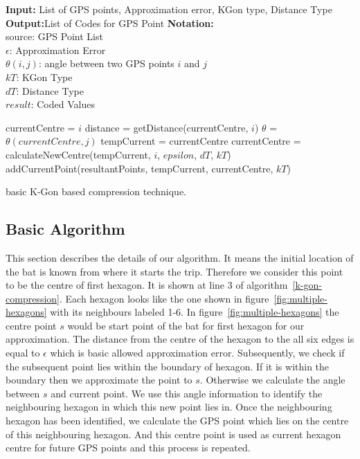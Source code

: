 \documentclass[conference]{IEEEtran}
\begin{document}
\begin{algorithm}[ht]
\textbf{Input:} List of GPS points, Approximation error, KGon type, Distance Type\\
\textbf{Output:}List of Codes for GPS Point
\textbf{Notation:}\\
source: GPS Point List\\
$\epsilon$: Approximation Error\\
$\theta(i,j)$: angle between two GPS points $i$ and $j$\\
$kT$: KGon Type\\
$dT$: Distance Type\\
$result$: Coded Values
\begin{algorithmic}[1]
   \State currentCentre = $i$
\Else
   \State distance = getDistance(currentCentre, $i$)
   \State $\theta$ = $\theta(currentCentre,j)$
        \State tempCurrent = currentCentre
        \State currentCentre = calculateNewCentre(tempCurrent, $i$, $epsilon$, $dT$, $kT$)
        \State addCurrentPoint(resultantPoints, tempCurrent, currentCentre, $kT$)
    \EndIf
\EndIf
\EndFor
\end{algorithmic}
\caption{basic K-Gon based compression technique.}
\label{k-gon-compression}
\end{algorithm}

\subsection{Basic Algorithm}
\label{subs:algorithm}

This section describes the details of our algorithm. It means the initial location of the bat is known from where it 
starts the trip. Therefore we consider this point to be the centre of first hexagon. It is shown at line 3 
of algorithm~\ref{k-gon-compression}. Each hexagon looks like the one shown in figure~\ref{fig:multiple-hexagons}
with its neighbours labeled 1-6. In figure~\ref{fig:multiple-hexagons} the centre point $s$ would be start 
point of the bat for first hexagon for our approximation. The distance from the centre of the hexagon to the 
all six edges is equal to $\epsilon$ which is basic allowed approximation error. Subsequently, we check if 
the subsequent point lies within the boundary of hexagon. If it is within the boundary then we approximate 
the point to $s$. Otherwise we calculate the angle between $s$ and current point. We use this angle information 
to identify the neighbouring hexagon in which this new point lies in. Once the neighbouring hexagon has been 
identified, we calculate the GPS point which lies on the centre of this neighbouring hexagon. And this centre 
point is used as current hexagon centre for future GPS points and this process is repeated.
\end{document}
